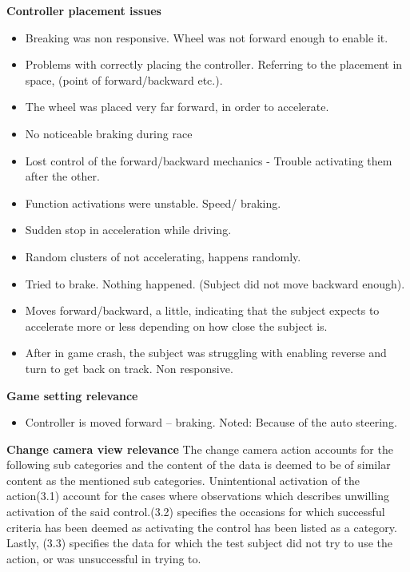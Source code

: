 \noindent\textbf{Controller placement issues}
\begin{itemize}
\item Breaking was non responsive. Wheel was not forward enough to enable it.
\item Problems with correctly placing the controller. Referring to the placement in space, (point of forward/backward etc.).
\item The wheel was placed very far forward, in order to accelerate.
\item No noticeable braking during race
\item Lost control of the forward/backward mechanics - Trouble activating them after the other.
\item Function activations were unstable. Speed/ braking.
\item Sudden stop in acceleration while driving.
\item Random clusters of not accelerating, happens randomly.
\item Tried to brake. Nothing happened. (Subject did not move backward enough).
\item Moves forward/backward, a little, indicating that the subject expects to accelerate more or less depending on how close the subject is.
\item After in game crash, the subject was struggling with enabling reverse and turn to get back on track. Non responsive.

\end{itemize}
\noindent\textbf{Game setting relevance}
\begin{itemize}
\item Controller is moved forward – braking. Noted: Because of the auto steering.
\end{itemize}
\bigskip

\noindent\colorbox{NotSkyBlue}{\textbf{Change camera view relevance}}\newline
The change camera action accounts for the following sub categories and the content of the data is deemed to be of similar content as the mentioned sub categories.
Unintentional activation of the action({\color{Red}3.1}) account for the cases where observations which describes unwilling activation of the said control.({\color{Red}3.2}) specifies the occasions for which successful criteria has been deemed as activating the control has been listed as a category. Lastly, ({\color{Red}3.3}) specifies the data for which the test subject did not try to use the action, or was unsuccessful in trying to.


